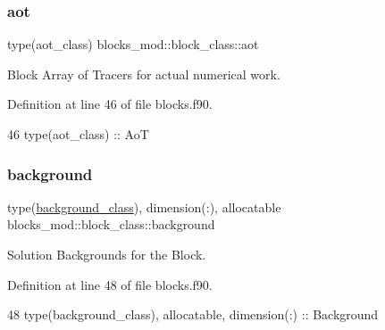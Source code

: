 \subsubsection{\texorpdfstring{aot}{aot}}
{\footnotesize\ttfamily type(aot\+\_\+class) blocks\+\_\+mod\+::block\+\_\+class\+::aot\hspace{0.3cm}{\ttfamily [private]}}



Block Array of Tracers for actual numerical work. 



Definition at line 46 of file blocks.\+f90.


\begin{DoxyCode}
46         \textcolor{keywordtype}{type}(aot\_class)        :: AoT
\end{DoxyCode}
\mbox{\label{structblocks__mod_1_1block__class_a774c07bf82d1392236abc81c285ea943}} 
\subsubsection{\texorpdfstring{background}{background}}
{\footnotesize\ttfamily type(\mbox{\hyperlink{structbackground__mod_1_1background__class}{background\+\_\+class}}), dimension(\+:), allocatable blocks\+\_\+mod\+::block\+\_\+class\+::background\hspace{0.3cm}{\ttfamily [private]}}



Solution Backgrounds for the Block. 



Definition at line 48 of file blocks.\+f90.


\begin{DoxyCode}
48         \textcolor{keywordtype}{type}(background\_class), \textcolor{keywordtype}{allocatable}, \textcolor{keywordtype}{dimension(:)} :: Background
\end{DoxyCode}
\mbox{\label{structblocks__mod_1_1block__class_a55e85183ba871abcaba1c00d5393611f}} 
